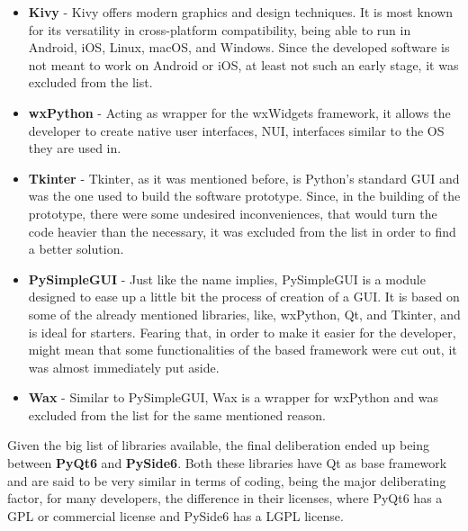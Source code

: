 \begin{itemize}
  \item \textbf{Kivy} - Kivy offers modern graphics and design techniques. It is most known for its versatility in cross-platform compatibility, being able to run in Android, iOS, Linux, macOS, and Windows. Since the developed software is not meant to work on Android or iOS, at least not such an early stage, it was excluded from the list.
  
  \item \textbf{wxPython} - Acting as wrapper for the wxWidgets framework, it allows the developer to create native user interfaces, NUI, interfaces similar to the OS they are used in.  %
  
  \newpage

  \item \textbf{Tkinter} - Tkinter, as it was mentioned before, is Python's standard GUI and was the one used to build the software prototype. Since, in the building of the prototype, there were some undesired inconveniences, that would turn the code heavier than the necessary, it was excluded from the list in order to find a better solution. 
  
  \item \textbf{PySimpleGUI} - Just like the name implies, PySimpleGUI is a module designed to ease up a little bit the process of creation of a GUI. It is based on some of the already mentioned libraries, like, wxPython, Qt, and Tkinter, and is ideal for starters. Fearing that, in order to make it easier for the developer, might mean that some functionalities of the based framework were cut out, it was almost immediately put aside.
  
  \item \textbf{Wax} - Similar to PySimpleGUI, Wax is a wrapper for wxPython and was excluded from the list for the same mentioned reason.  
  
\end{itemize}


Given the big list of libraries available, the final deliberation ended up being between \textbf{PyQt6} and \textbf{PySide6}. Both these libraries have Qt as base framework and are said to be very similar in terms of coding, being the major deliberating factor, for many developers, the difference in their licenses, where PyQt6 has a GPL or commercial license and PySide6 has a LGPL license.


